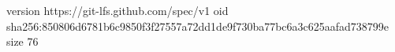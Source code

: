 version https://git-lfs.github.com/spec/v1
oid sha256:850806d6781b6c9850f3f27557a72dd1de9f730ba77bc6a3c625aafad738799e
size 76
